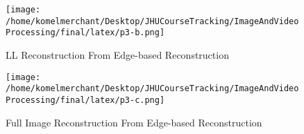 \documentclass{article}
\begin{document}
\begin{figure}[h!]
	\centering
	\texttt{[image: /home/komelmerchant/Desktop/JHUCourseTracking/ImageAndVideoProcessing/final/latex/p3-b.png]}
	\caption{LL Reconstruction From Edge-based Reconstruction}
	\label{fig:p3b}
\end{figure}


\begin{figure}[h!]
	\centering
	\texttt{[image: /home/komelmerchant/Desktop/JHUCourseTracking/ImageAndVideoProcessing/final/latex/p3-c.png]}
	\caption{Full Image Reconstruction From Edge-based Reconstruction}
	\label{fig:p3c}
\end{figure}










\pagebreak
\end{document}

